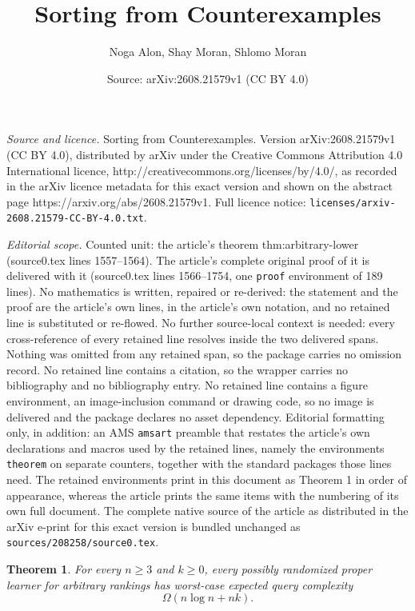\documentclass[10pt,a4paper]{amsart}
\title{Sorting from Counterexamples}
\author{Noga Alon, Shay Moran, Shlomo Moran}
\date{Source: arXiv:2608.21579v1 (CC BY 4.0)}
\newtheorem{theorem}{Theorem}
\begin{document}
\maketitle

\noindent\emph{Source and licence.} Sorting from Counterexamples. Version arXiv:2608.21579v1 (CC BY 4.0), distributed by arXiv under the Creative Commons Attribution 4.0 International licence, http://creativecommons.org/licenses/by/4.0/, as recorded in the arXiv licence metadata for this exact version and shown on the abstract page https://arxiv.org/abs/2608.21579v1. Full licence notice: \texttt{licenses/arxiv-2608.21579-CC-BY-4.0.txt}.\par\smallskip

\noindent\textit{Editorial scope.} Counted unit: the article's theorem thm:arbitrary-lower (source0.tex lines 1557--1564). The article's complete original proof of it is delivered with it (source0.tex lines 1566--1754, one \texttt{proof} environment of 189 lines). No mathematics is written, repaired or re-derived: the statement and the proof are the article's own lines, in the article's own notation, and no retained line is substituted or re-flowed.  No further source-local context is needed: every cross-reference of every retained line resolves inside the two delivered spans.  Nothing was omitted from any retained span, so the package carries no omission record.  No retained line contains a citation, so the wrapper carries no bibliography and no bibliography entry.  No retained line contains a figure environment, an image-inclusion command or drawing code, so no image is delivered and the package declares no asset dependency.  Editorial formatting only, in addition: an AMS \texttt{amsart} preamble that restates the article's own declarations and macros used by the retained lines, namely the environments \texttt{theorem} on separate counters, together with the standard packages those lines need.  The retained environments print in this document as Theorem 1 in order of appearance, whereas the article prints the same items with the numbering of its own full document.  The complete native source of the article as distributed in the arXiv e-print for this exact version is bundled unchanged as \texttt{sources/208258/source0.tex}.
\begin{theorem}
\label{thm:arbitrary-lower}
For every $n\geq 3$ and $k\geq 0$, every possibly randomized proper learner
for arbitrary rankings has worst-case expected query complexity
\[
    \Omega(n\log n+nk).
\]
\end{theorem}
\end{document}
